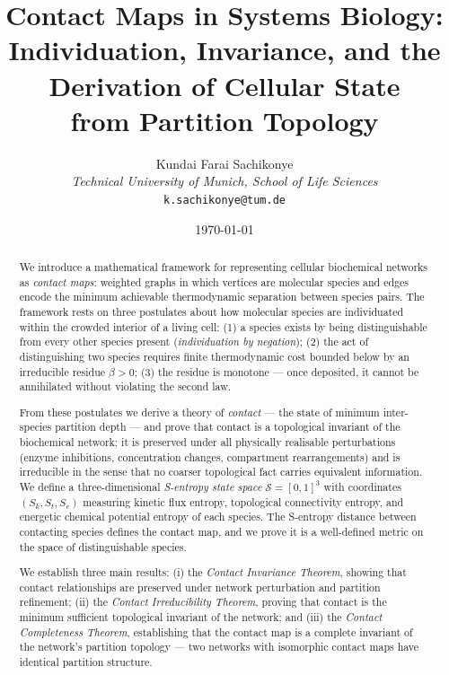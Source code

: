 \documentclass[11pt,twocolumn]{article}
\title{Contact Maps in Systems Biology:\\
Individuation, Invariance, and the Derivation of Cellular State\\
from Partition Topology}
\author{Kundai Farai Sachikonye\\
\textit{Technical University of Munich, School of Life Sciences}\\
\texttt{k.sachikonye@tum.de}}
\date{\today}
\theoremstyle{plain}
\theoremstyle{definition}
\newcommand{\Sk}{S_k}
\newcommand{\St}{S_t}
\newcommand{\Se}{S_e}
\begin{document}
\maketitle

\begin{abstract}

We introduce a mathematical framework for representing cellular biochemical
networks as \emph{contact maps}: weighted graphs in which vertices are molecular
species and edges encode the minimum achievable thermodynamic separation between
species pairs. The framework rests on three postulates about how molecular
species are individuated within the crowded interior of a living cell: (1) a
species exists by being distinguishable from every other species present
(\emph{individuation by negation}); (2) the act of distinguishing two species
requires finite thermodynamic cost bounded below by an irreducible residue
$\beta > 0$; (3) the residue is monotone --- once deposited, it cannot be
annihilated without violating the second law.

From these postulates we derive a theory of \emph{contact} --- the state of
minimum inter-species partition depth --- and prove that contact is a
topological invariant of the biochemical network: it is preserved under all
physically realisable perturbations (enzyme inhibitions, concentration changes,
compartment rearrangements) and is irreducible in the sense that no coarser
topological fact carries equivalent information. We define a three-dimensional
\emph{S-entropy state space} $\mathcal{S} = [0,1]^3$ with coordinates
$(\Sk, \St, \Se)$ measuring kinetic flux entropy, topological connectivity
entropy, and energetic chemical potential entropy of each species. The
S-entropy distance between contacting species defines the contact map, and we
prove it is a well-defined metric on the space of distinguishable species.

We establish three main results: (i) the \emph{Contact Invariance Theorem},
showing that contact relationships are preserved under network perturbation and
partition refinement; (ii) the \emph{Contact Irreducibility Theorem}, proving
that contact is the minimum sufficient topological invariant of the network;
and (iii) the \emph{Contact Completeness Theorem}, establishing that the
contact map is a complete invariant of the network's partition topology --- two
networks with isomorphic contact maps have identical partition structure.


\end{abstract}
\end{document}
